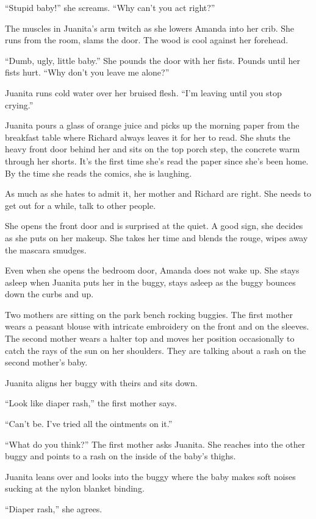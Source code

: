 \documentclass[twoside,10pt]{book}
\begin{document}
``Stupid baby!'' she screams. ``Why can't you act right?''

The muscles in Juanita's arm twitch as she lowers Amanda into her crib.
She runs from the room, slams the door. The wood is cool against her
forehead.

``Dumb, ugly, little baby.'' She pounds the door with her fists. Pounds
until her fists hurt. ``Why don't you leave me alone?''

Juanita runs cold water over her bruised flesh. ``I'm leaving until you
stop crying.''

Juanita pours a glass of orange juice and picks up the morning paper
from the breakfast table where Richard always leaves it for her to read.
She shuts the heavy front door behind her and sits on the top porch
step, the concrete warm through her shorts. It's the first time she's
read the paper since she's been home. By the time she reads the comics,
she is laughing.

As much as she hates to admit it, her mother and Richard are right. She
needs to get out for a while, talk to other people.

She opens the front door and is surprised at the quiet. A good sign, she
decides as she puts on her makeup. She takes her time and blends the
rouge, wipes away the mascara smudges.

Even when she opens the bedroom door, Amanda does not wake up. She stays
asleep when Juanita puts her in the buggy, stays asleep as the buggy
bounces down the curbs and up.

Two mothers are sitting on the park bench rocking buggies. The first
mother wears a peasant blouse with intricate embroidery on the front and
on the sleeves. The second mother wears a halter top and moves her
position occasionally to catch the rays of the sun on her shoulders.
They are talking about a rash on the second mother's baby.

Juanita aligns her buggy with theirs and sits down.

``Look like diaper rash,'' the first mother says.

``Can't be. I've tried all the ointments on it.''

``What do you think?'' The first mother asks Juanita. She reaches into
the other buggy and points to a rash on the inside of the baby's thighs.

Juanita leans over and looks into the buggy where the baby makes soft
noises sucking at the nylon blanket binding.

``Diaper rash,'' she agrees.
\end{document}
